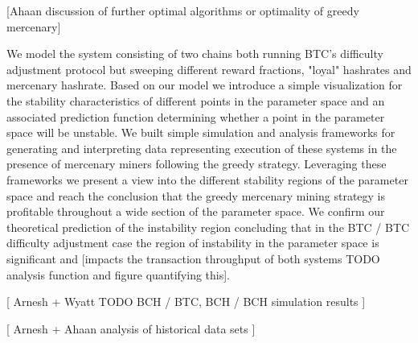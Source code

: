 \documentclass[12pt, preprint]{aastex}
\begin{document}
[Ahaan discussion of further optimal algorithms or optimality of greedy mercenary]

We model the system consisting of two chains both running BTC's difficulty adjustment protocol but sweeping different reward fractions, "loyal" hashrates and mercenary hashrate.  Based on our model we introduce a simple visualization for the stability characteristics of different points in the parameter space and an associated prediction function determining whether a point in the parameter space will be unstable. We built simple simulation and analysis frameworks for generating and interpreting data representing execution of these systems in the presence of mercenary miners following the greedy strategy.  Leveraging these frameworks we present a view into the different stability regions of the parameter space and reach the conclusion that the greedy mercenary mining strategy is profitable throughout a wide section of the parameter space.  We confirm our theoretical prediction of the instability region concluding that in the BTC / BTC difficulty adjustment case the region of instability in the parameter space is significant and  [impacts the transaction throughput of both systems TODO analysis function and figure quantifying this]. 

[ Arnesh + Wyatt TODO BCH / BTC, BCH / BCH simulation results ] 

[ Arnesh + Ahaan analysis of historical data sets ]
\end{document}
